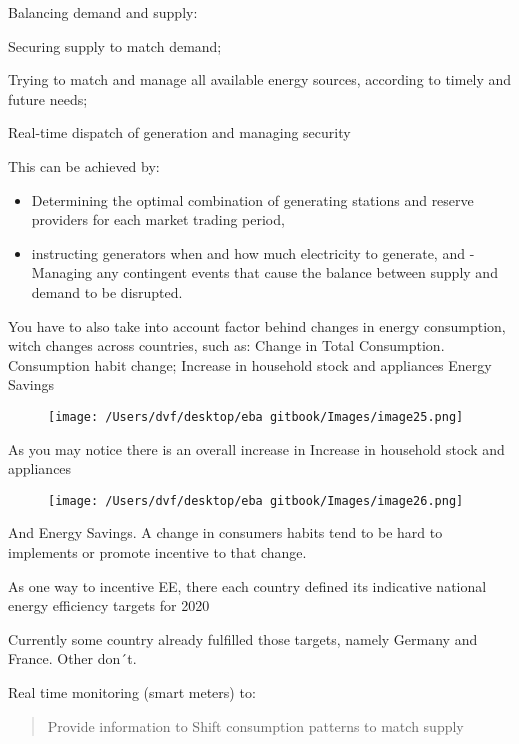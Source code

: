 \documentclass[]{book}
\providecommand{\tightlist}{%
  \setlength{\itemsep}{0pt}\setlength{\parskip}{0pt}}
\theoremstyle{definition}
\theoremstyle{definition}
\theoremstyle{definition}
\theoremstyle{remark}
\begin{document}
Balancing demand and supply:

Securing supply to match demand;

Trying to match and manage all available energy sources, according to
timely and future needs;

Real-time dispatch of generation and managing security

This can be achieved by:

\begin{itemize}
\tightlist
\item
  Determining the optimal combination of generating stations and reserve
  providers for each market trading period,
\item
  instructing generators when and how much electricity to generate, and
  -Managing any contingent events that cause the balance between supply
  and demand to be disrupted.
\end{itemize}

You have to also take into account factor behind changes in energy
consumption, witch changes across countries, such as: Change in Total
Consumption. Consumption habit change; Increase in household stock and
appliances Energy Savings

\begin{figure}[htbp]
\centering
\texttt{[image: /Users/dvf/desktop/eba gitbook/Images/image25.png]}
\caption{}
\end{figure}

As you may notice there is an overall increase in Increase in household
stock and appliances

\begin{figure}[htbp]
\centering
\texttt{[image: /Users/dvf/desktop/eba gitbook/Images/image26.png]}
\caption{}
\end{figure}

And Energy Savings. A change in consumers habits tend to be hard to
implements or promote incentive to that change.

As one way to incentive EE, there each country defined its indicative
national energy efficiency targets for 2020

Currently some country already fulfilled those targets, namely Germany
and France. Other don´t.

Real time monitoring (smart meters) to:

\begin{quote}
Provide information to Shift consumption patterns to match supply
\end{quote}
\end{document}
